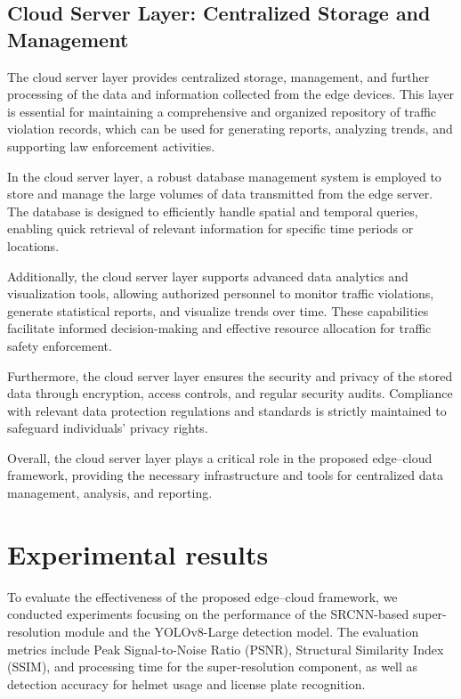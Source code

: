 \documentclass[conference]{IEEEtran}
\begin{document}
\subsection{Cloud Server Layer: Centralized Storage and Management}
\label{subsec:cloud_layer}

The cloud server layer provides centralized storage, management, and further processing of the data and information collected from the edge devices. This layer is essential for maintaining a comprehensive and organized repository of traffic violation records, which can be used for generating reports, analyzing trends, and supporting law enforcement activities.

In the cloud server layer, a robust database management system is employed to store and manage the large volumes of data transmitted from the edge server. The database is designed to efficiently handle spatial and temporal queries, enabling quick retrieval of relevant information for specific time periods or locations.

Additionally, the cloud server layer supports advanced data analytics and visualization tools, allowing authorized personnel to monitor traffic violations, generate statistical reports, and visualize trends over time. These capabilities facilitate informed decision-making and effective resource allocation for traffic safety enforcement.

Furthermore, the cloud server layer ensures the security and privacy of the stored data through encryption, access controls, and regular security audits. Compliance with relevant data protection regulations and standards is strictly maintained to safeguard individuals' privacy rights.

Overall, the cloud server layer plays a critical role in the proposed edge–cloud framework, providing the necessary infrastructure and tools for centralized data management, analysis, and reporting.

\section{Experimental results}

To evaluate the effectiveness of the proposed edge–cloud framework, we conducted experiments focusing on the performance of the SRCNN-based super-resolution module and the YOLOv8-Large detection model. The evaluation metrics include Peak Signal-to-Noise Ratio (PSNR), Structural Similarity Index (SSIM), and processing time for the super-resolution component, as well as detection accuracy for helmet usage and license plate recognition.
\end{document}
